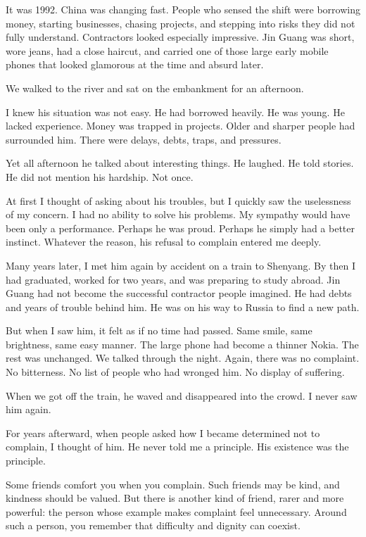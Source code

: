It was 1992. China was changing fast. People who sensed the shift were borrowing money, starting businesses, chasing projects, and stepping into risks they did not fully understand. Contractors looked especially impressive. Jin Guang was short, wore jeans, had a close haircut, and carried one of those large early mobile phones that looked glamorous at the time and absurd later.

We walked to the river and sat on the embankment for an afternoon.

I knew his situation was not easy. He had borrowed heavily. He was young. He lacked experience. Money was trapped in projects. Older and sharper people had surrounded him. There were delays, debts, traps, and pressures.

Yet all afternoon he talked about interesting things. He laughed. He told stories. He did not mention his hardship. Not once.

At first I thought of asking about his troubles, but I quickly saw the uselessness of my concern. I had no ability to solve his problems. My sympathy would have been only a performance. Perhaps he was proud. Perhaps he simply had a better instinct. Whatever the reason, his refusal to complain entered me deeply.

Many years later, I met him again by accident on a train to Shenyang. By then I had graduated, worked for two years, and was preparing to study abroad. Jin Guang had not become the successful contractor people imagined. He had debts and years of trouble behind him. He was on his way to Russia to find a new path.

But when I saw him, it felt as if no time had passed. Same smile, same brightness, same easy manner. The large phone had become a thinner Nokia. The rest was unchanged. We talked through the night. Again, there was no complaint. No bitterness. No list of people who had wronged him. No display of suffering.

When we got off the train, he waved and disappeared into the crowd. I never saw him again.

For years afterward, when people asked how I became determined not to complain, I thought of him. He never told me a principle. His existence was the principle.

Some friends comfort you when you complain. Such friends may be kind, and kindness should be valued. But there is another kind of friend, rarer and more powerful: the person whose example makes complaint feel unnecessary. Around such a person, you remember that difficulty and dignity can coexist.

